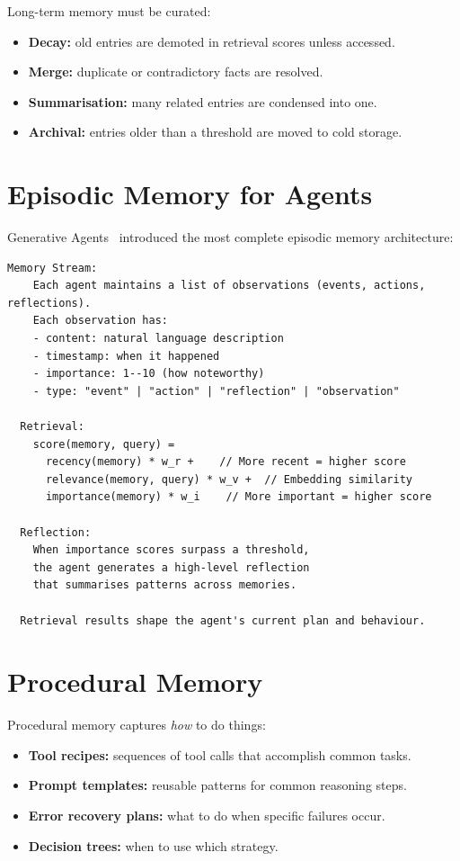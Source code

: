 Long-term memory must be curated:

\begin{itemize}
	\item \textbf{Decay:} old entries are demoted in retrieval scores unless accessed.
	\item \textbf{Merge:} duplicate or contradictory facts are resolved.
	\item \textbf{Summarisation:} many related entries are condensed into one.
	\item \textbf{Archival:} entries older than a threshold are moved to cold storage.
\end{itemize}

\section{Episodic Memory for Agents}

Generative Agents~\cite{park2023generative} introduced the most complete episodic memory architecture:

\begin{lstlisting}[caption=Generative Agents memory stream]
  Memory Stream:
    Each agent maintains a list of observations (events, actions, reflections).
    Each observation has:
    - content: natural language description
    - timestamp: when it happened
    - importance: 1--10 (how noteworthy)
    - type: "event" | "action" | "reflection" | "observation"

  Retrieval:
    score(memory, query) =
      recency(memory) * w_r +    // More recent = higher score
      relevance(memory, query) * w_v +  // Embedding similarity
      importance(memory) * w_i    // More important = higher score

  Reflection:
    When importance scores surpass a threshold,
    the agent generates a high-level reflection
    that summarises patterns across memories.

  Retrieval results shape the agent's current plan and behaviour.
\end{lstlisting}

\section{Procedural Memory}

Procedural memory captures \emph{how} to do things:

\begin{itemize}
	\item \textbf{Tool recipes:} sequences of tool calls that accomplish common tasks.
	\item \textbf{Prompt templates:} reusable patterns for common reasoning steps.
	\item \textbf{Error recovery plans:} what to do when specific failures occur.
	\item \textbf{Decision trees:} when to use which strategy.
\end{itemize}

